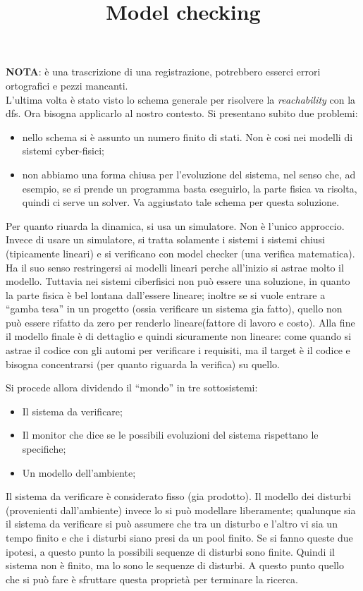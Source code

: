 \documentclass[a4paper, 11pt]{article}
\title{Model checking}
\begin{document}
\maketitle

\textbf{NOTA}: è una trascrizione di una registrazione, potrebbero esserci errori ortografici e pezzi mancanti. \\

 L'ultima volta è stato visto lo schema generale per risolvere la \emph{reachability} con la dfs. Ora bisogna applicarlo al nostro contesto. Si presentano subito due problemi:
 \begin{itemize}
  \item nello schema si è assunto un numero finito di stati. Non è cosi nei modelli di sistemi cyber-fisici;
  \item non abbiamo una forma chiusa per l'evoluzione del sistema, nel senso che, ad esempio, se si prende un programma basta eseguirlo, la parte fisica va risolta, quindi ci serve un solver. Va aggiustato tale schema per questa soluzione.
 \end{itemize}

 Per quanto riuarda la dinamica, si usa un simulatore. Non è l'unico approccio. Invece di usare un simulatore, si tratta solamente i sistemi i sistemi chiusi (tipicamente lineari) e si verificano con model checker (una verifica matematica). Ha il suo senso restringersi ai modelli lineari perche all'inizio si astrae molto il modello. Tuttavia nei sistemi ciberfisici non può essere una soluzione, in quanto la parte fisica è bel lontana dall'essere lineare; inoltre se si vuole entrare a ``gamba tesa'' in un progetto (ossia verificare un sistema gia fatto), quello non può essere rifatto da zero per renderlo lineare(fattore di lavoro e costo). Alla fine il modello finale è di dettaglio e quindi sicuramente non lineare: come quando si astrae il codice con gli automi per verificare i requisiti, ma il target è il codice e bisogna concentrarsi (per quanto riguarda la verifica) su quello.

 Si procede allora dividendo il ``mondo'' in tre sottosistemi:
 \begin{itemize}
  \item Il sistema da verificare;
  \item Il monitor che dice se le possibili evoluzioni del sistema rispettano le specifiche;
  \item Un modello dell'ambiente;
 \end{itemize}

 Il sistema da verificare è considerato fisso (gia prodotto). Il modello dei disturbi (provenienti dall'ambiente) invece lo si può modellare liberamente; qualunque sia il sistema da verificare si può assumere che tra un disturbo e l'altro vi sia un tempo finito e che i disturbi siano presi da un pool finito. Se si fanno queste due ipotesi, a questo punto la possibili sequenze di disturbi sono finite. Quindi il sistema non è finito, ma lo sono le sequenze di disturbi. A questo punto quello che si può fare è sfruttare questa proprietà per terminare la ricerca.\\
\end{document}
